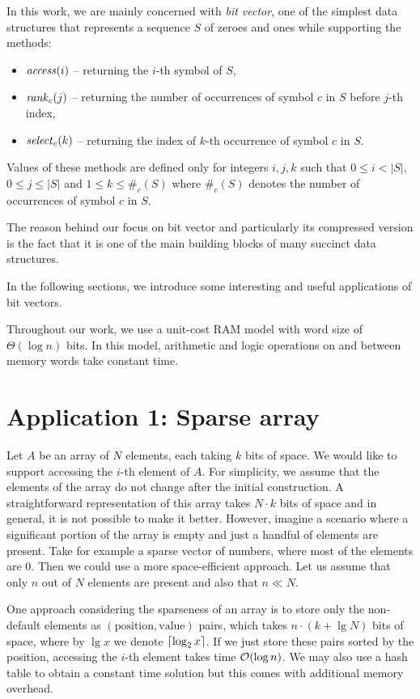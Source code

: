 In this work, we are mainly concerned with \textit{bit vector}, one of the simplest
data structures that represents a sequence $S$ of zeroes and ones while supporting the
methods:
\begin{itemize}
	\item $\mathit{access}(i)$ -- returning the $i$-th symbol of $S$,
	\item $\mathit{rank}_c(j)$ -- returning the number of occurrences of symbol $c$ in $S$ before $j$-th index,
	\item $\mathit{select}_c(k)$ -- returning the index of $k$-th occurrence of symbol $c$ in $S$.
\end{itemize}
Values of these methods are defined only for integers $i, j, k$ such that $0\leq i<|S|$, $0\leq j\leq |S|$
and $1\leq k\leq \#_c(S)$ where $\#_c(S)$ denotes the number of occurrences of symbol $c$ in $S$.

The reason behind our focus on bit vector and particularly its compressed version
is the fact that it is one of the main building blocks of many succinct data structures.

In the following sections, we introduce some interesting and useful applications of bit vectors.

Throughout our work, we use a unit-cost RAM model with word size of $\Theta(\log n)$ bits.
In this model, arithmetic and logic operations on and between memory words take constant time.

\section{Application 1: Sparse array}

Let $A$ be an array of $N$ elements, each taking $k$ bits of space. We would like
to support accessing the $i$-th element of $A$. For simplicity, we assume that
the elements of the array do not change after the initial construction. A straightforward
representation of this array takes $N\cdot k$ bits of space and in general, it is not
possible to make it better. However, imagine a scenario where a significant portion
of the array is empty and just a handful of elements are present. Take for example a
sparse vector of numbers, where most of the elements are 0. Then we could use a more
space-efficient approach. Let us assume that only $n$ out of $N$ elements are present
and also that $n\ll N$.

One approach considering the sparseness of an array is to store only the non-default
elements as $(\text{position}, \text{value})$ pairs, which takes $n\cdot (k+\lg N)$
bits of space, where by $\lg x$ we denote $\left\lceil \log_2 x \right\rceil$. If we just store these
pairs sorted by the position, accessing the $i$-th element takes time $\mathcal{O}(\log n)$.
We may also use a hash table to obtain a constant time solution but this comes with
additional memory overhead.

